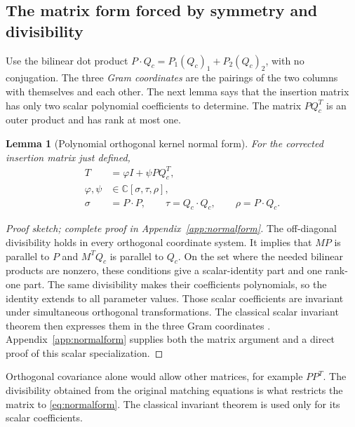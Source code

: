 \documentclass[11pt]{article}
\newtheorem{lemma}[theorem]{Lemma}
\theoremstyle{definition}
\theoremstyle{plain}
\numberwithin{equation}{section}
\begin{document}
\subsection{The matrix form forced by symmetry and divisibility}

Use the bilinear dot product
\(P\cdot Q_c=P_1(Q_c)_1+P_2(Q_c)_2\), with no conjugation. The three
\emph{Gram coordinates} are the pairings of the two columns with themselves
and each other. The next lemma says that the insertion matrix has only two
scalar polynomial coefficients to determine. The matrix \(PQ_c^T\) is an
outer product and has rank at most one.

\begin{lemma}[Polynomial orthogonal kernel normal form]\label{lem:matrix}
For the corrected insertion matrix just defined,
\begin{equation}
 \begin{aligned}
 T&=\varphi I+\psi PQ_c^T,\\
 \varphi,\psi&\in\mathbb C[\sigma,\tau,\rho],\\
 \sigma&=P\cdot P,\qquad \tau=Q_c\cdot Q_c,\qquad \rho=P\cdot Q_c.
 \end{aligned}
 \tag{9}\label{eq:normalform}
\end{equation}
\end{lemma}

\begin{proof}[Proof sketch; complete proof in Appendix~\ref{app:normalform}]
The off-diagonal divisibility holds in every orthogonal coordinate system.
It implies that \(MP\) is parallel to \(P\) and \(M^TQ_c\) is parallel
to \(Q_c\). On the set where the needed bilinear products are nonzero,
these conditions give a scalar-identity part and one rank-one part.
The same divisibility makes their coefficients polynomials, so the identity
extends to all parameter values. Those scalar coefficients are invariant
under simultaneous orthogonal transformations. The classical scalar
invariant theorem then expresses them in the three Gram coordinates
\cite[Section~10.2(a)]{kraft}. Appendix~\ref{app:normalform} supplies both
the matrix argument and a direct proof of this scalar specialization.
\end{proof}

Orthogonal covariance alone would allow other matrices, for example
\(PP^T\). The divisibility obtained from the original matching equations
is what restricts the matrix to \eqref{eq:normalform}. The classical
invariant theorem is used only for its scalar coefficients.
\end{document}

